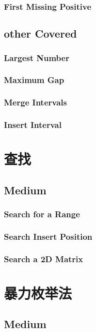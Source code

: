 \documentclass[12pt]{book}
\begin{document}
\subsection{First Missing Positive}
\label{sec-7-3-3}
\section{other Covered}
\label{sec-7-4}
\subsection{Largest Number}
\label{sec-7-4-1}
\subsection{Maximum Gap}
\label{sec-7-4-2}
\subsection{Merge Intervals}
\label{sec-7-4-3}
\subsection{Insert Interval}
\label{sec-7-4-4}
\chapter{查找}
\label{sec-8}
\section{Medium}
\label{sec-8-1}
\subsection{Search for a Range}
\label{sec-8-1-1}
\subsection{Search Insert Position}
\label{sec-8-1-2}
\subsection{Search a 2D Matrix}
\label{sec-8-1-3}

\chapter{暴力枚举法}
\label{sec-9}
\section{Medium}
\label{sec-9-1}
\end{document}
